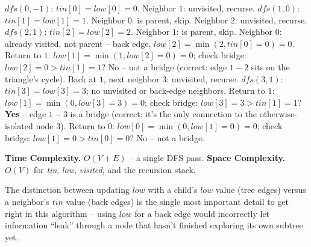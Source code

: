 $\textit{dfs}(0,-1)$: $\textit{tin}[0]=\textit{low}[0]=0$. Neighbor
$1$: unvisited, recurse. $\textit{dfs}(1,0)$:
$\textit{tin}[1]=\textit{low}[1]=1$. Neighbor $0$: is parent, skip.
Neighbor $2$: unvisited, recurse. $\textit{dfs}(2,1)$:
$\textit{tin}[2]=\textit{low}[2]=2$. Neighbor $1$: is parent, skip.
Neighbor $0$: already visited, not parent -- back edge,
$\textit{low}[2]=\min(2,\textit{tin}[0]{=}0)=0$. Return to $1$:
$\textit{low}[1]=\min(1,\textit{low}[2]{=}0)=0$; check bridge:
$\textit{low}[2]{=}0 > \textit{tin}[1]{=}1$? No -- not a bridge
(correct: edge $1{-}2$ sits on the triangle's cycle). Back at $1$,
next neighbor $3$: unvisited, recurse. $\textit{dfs}(3,1)$:
$\textit{tin}[3]=\textit{low}[3]=3$; no unvisited or back-edge
neighbors. Return to $1$: $\textit{low}[1]=\min(0,\textit{low}[3]{=}3)=0$;
check bridge: $\textit{low}[3]{=}3 > \textit{tin}[1]{=}1$? \textbf{Yes}
-- edge $1{-}3$ is a bridge (correct: it's the only connection to the
otherwise-isolated node $3$). Return to $0$: $\textit{low}[0]=
\min(0,\textit{low}[1]{=}0)=0$; check bridge:
$\textit{low}[1]{=}0 > \textit{tin}[0]{=}0$? No -- not a bridge.

\begin{complexitybox}
\textbf{Time Complexity.} $O(V+E)$ -- a single DFS pass.
\textbf{Space Complexity.} $O(V)$ for \textit{tin}, \textit{low},
\textit{visited}, and the recursion stack.
\end{complexitybox}

\begin{takeawaybox}
The distinction between updating $\textit{low}$ with a child's
$\textit{low}$ value (tree edges) versus a neighbor's $\textit{tin}$
value (back edges) is the single most important detail to get right in
this algorithm -- using $\textit{low}$ for a back edge would
incorrectly let information ``leak'' through a node that hasn't
finished exploring its own subtree yet.
\end{takeawaybox}
